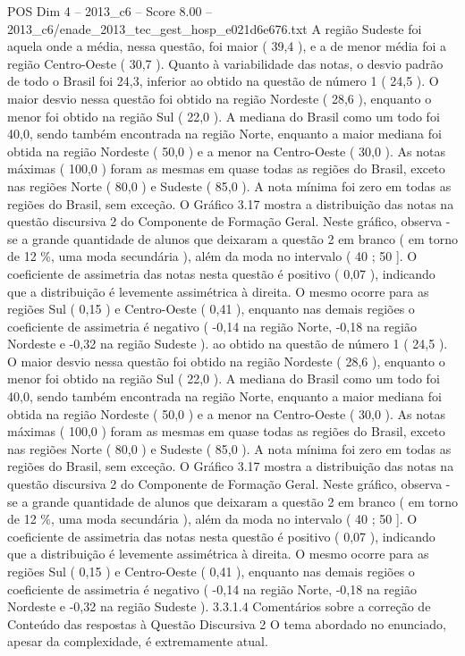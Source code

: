 \begin{textsample}{POS Dim 4 – 2013\_c6 – Score 8.00 – 2013\_c6/enade\_2013\_tec\_gest\_hosp\_e021d6e676.txt}
A região Sudeste foi aquela onde a média, nessa questão, foi maior ( 39,4 ), e a de menor média foi a região Centro-Oeste ( 30,7 ).
Quanto à variabilidade das notas, o desvio padrão de todo o Brasil foi 24,3, inferior ao obtido na questão de número 1 ( 24,5 ).
O maior desvio nessa questão foi obtido na região Nordeste ( 28,6 ), enquanto o menor foi obtido na região Sul ( 22,0 ).
A mediana do Brasil como um todo foi 40,0, sendo também encontrada na região Norte, enquanto a maior mediana foi obtida na região Nordeste ( 50,0 ) e a menor na Centro-Oeste ( 30,0 ).
As notas máximas ( 100,0 ) foram as mesmas em quase todas as regiões do Brasil, exceto nas regiões Norte ( 80,0 ) e Sudeste ( 85,0 ).
A nota mínima foi zero em todas as regiões do Brasil, sem exceção.
O Gráfico 3.17 mostra a distribuição das notas na questão discursiva 2 do Componente de Formação Geral.
Neste gráfico, observa -se a grande quantidade de alunos que deixaram a questão 2 em branco ( em torno de 12 \%, uma moda secundária ), além da moda no intervalo ( 40 ; 50 ].
O coeficiente de assimetria das notas nesta questão é positivo ( 0,07 ), indicando que a distribuição é levemente assimétrica à direita.
O mesmo ocorre para as regiões Sul ( 0,15 ) e Centro-Oeste ( 0,41 ), enquanto nas demais regiões o coeficiente de assimetria é negativo ( -0,14 na região Norte, -0,18 na região Nordeste e -0,32 na região Sudeste ). ao obtido na questão de número 1 ( 24,5 ).
O maior desvio nessa questão foi obtido na região Nordeste ( 28,6 ), enquanto o menor foi obtido na região Sul ( 22,0 ).
A mediana do Brasil como um todo foi 40,0, sendo também encontrada na região Norte, enquanto a maior mediana foi obtida na região Nordeste ( 50,0 ) e a menor na Centro-Oeste ( 30,0 ).
As notas máximas ( 100,0 ) foram as mesmas em quase todas as regiões do Brasil, exceto nas regiões Norte ( 80,0 ) e Sudeste ( 85,0 ).
A nota mínima foi zero em todas as regiões do Brasil, sem exceção.
O Gráfico 3.17 mostra a distribuição das notas na questão discursiva 2 do Componente de Formação Geral.
Neste gráfico, observa -se a grande quantidade de alunos que deixaram a questão 2 em branco ( em torno de 12 \%, uma moda secundária ), além da moda no intervalo ( 40 ; 50 ].
O coeficiente de assimetria das notas nesta questão é positivo ( 0,07 ), indicando que a distribuição é levemente assimétrica à direita.
O mesmo ocorre para as regiões Sul ( 0,15 ) e Centro-Oeste ( 0,41 ), enquanto nas demais regiões o coeficiente de assimetria é negativo ( -0,14 na região Norte, -0,18 na região Nordeste e -0,32 na região Sudeste ). 3.3.1.4 Comentários sobre a correção de Conteúdo das respostas à Questão Discursiva 2 O tema abordado no enunciado, apesar da complexidade, é extremamente atual.

\end{textsample}

